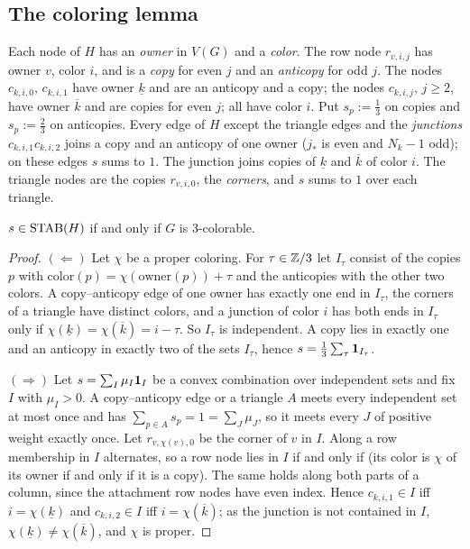 \subsection{The coloring lemma}\label{sec:coloring}

Each node of $H$ has an \emph{owner} in $V(G)$ and a \emph{color}. The row node $r_{v,i,j}$ has owner $v$, color $i$, and is a \emph{copy} for even $j$ and an \emph{anticopy} for odd $j$. The nodes $c_{k,i,0}$, $c_{k,i,1}$ have owner $\underline k$ and are an anticopy and a copy; the nodes $c_{k,i,j}$, $j\ge2$, have owner $\overline k$ and are copies for even $j$; all have color $i$. Put $s_p:=\frac13$ on copies and $s_p:=\frac23$ on anticopies. Every edge of $H$ except the triangle edges and the \emph{junctions} $c_{k,i,1}c_{k,i,2}$ joins a copy and an anticopy of one owner ($j_*$ is even and $N_k-1$ odd); on these edges $s$ sums to $1$. The junction joins copies of $\underline k$ and $\overline k$ of color $i$. The triangle nodes are the copies $r_{v,i,0}$, the \emph{corners}, and $s$ sums to $1$ over each triangle.

\begin{lemma}[coloring]\label{lem:coloring}
$s\in\operatorname{STAB}(H)$ if and only if $G$ is 3-colorable.
\end{lemma}

\begin{proof}
$(\Leftarrow)$ Let $\chi$ be a proper coloring. For $\tau\in\mathbb{Z}/3$ let $I_\tau$ consist of the copies $p$ with $\mathrm{color}(p)=\chi(\mathrm{owner}(p))+\tau$ and the anticopies with the other two colors. A copy--anticopy edge of one owner has exactly one end in $I_\tau$, the corners of a triangle have distinct colors, and a junction of color $i$ has both ends in $I_\tau$ only if $\chi(\underline k)=\chi(\overline k)=i-\tau$. So $I_\tau$ is independent. A copy lies in exactly one and an anticopy in exactly two of the sets $I_\tau$, hence $s=\frac13\sum_\tau\mathbf 1_{I_\tau}$.

$(\Rightarrow)$ Let $s=\sum_I\mu_I\mathbf 1_{I}$ be a convex combination over independent sets and fix $I$ with $\mu_I>0$. A copy--anticopy edge or a triangle $A$ meets every independent set at most once and has $\sum_{p\in A}s_p=1=\sum_J\mu_J$, so it meets every $J$ of positive weight exactly once. Let $r_{v,\chi(v),0}$ be the corner of $v$ in $I$. Along a row membership in $I$ alternates, so a row node lies in $I$ if and only if (its color is $\chi$ of its owner if and only if it is a copy). The same holds along both parts of a column, since the attachment row nodes have even index. Hence $c_{k,i,1}\in I$ iff $i=\chi(\underline k)$ and $c_{k,i,2}\in I$ iff $i=\chi(\overline k)$; as the junction is not contained in $I$, $\chi(\underline k)\ne\chi(\overline k)$, and $\chi$ is proper.
\end{proof}

